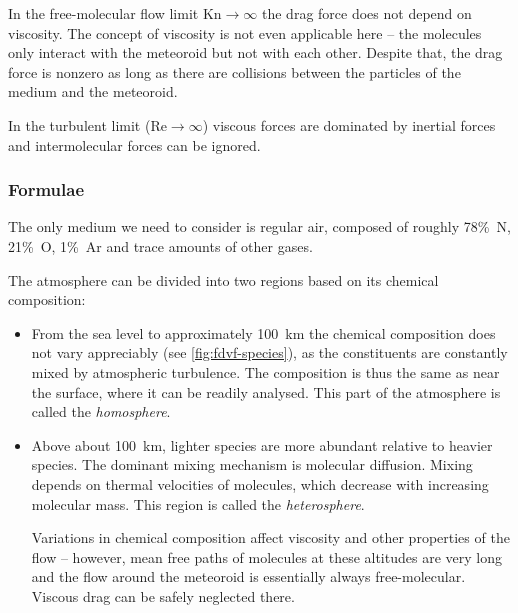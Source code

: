         In the free-molecular flow limit $\mathrm{Kn} \to \infty$ the drag force does not
        depend on viscosity. The concept of viscosity is not even applicable here -- the
        molecules only interact with the meteoroid but not with each other.
        Despite that, the drag force is nonzero as long as there are collisions
        between the particles of the medium and the meteoroid.

        In the turbulent limit ($\mathrm{Re} \to \infty$) viscous forces are dominated
        by inertial forces and intermolecular forces can be ignored.

        \subsubsection{Formulae} \label{fdvf}
            The only medium we need to consider is regular air, composed of roughly 78\%~N,
            21\%~O, 1\%~Ar and trace amounts of other gases.

            \begin{example}
                The atmosphere can be divided into two regions based on its chemical composition:
                \begin{itemize}
                    \item From the sea level to approximately \SI{100}{\kilo\metre} the chemical
                        composition does not vary appreciably (see \cref{fig:fdvf-species}),
                        as the constituents are constantly mixed by atmospheric turbulence.
                        The composition is thus the same as near the surface, where it can be readily analysed.
                        This part of the atmosphere is called the \emph{homosphere}.
                    \item Above about \SI{100}{\kilo\metre}, lighter species are more abundant
                        relative to heavier species. The dominant mixing mechanism is molecular diffusion.
                        Mixing depends on thermal velocities of molecules, which decrease
                        with increasing molecular mass. This region is called the \emph{heterosphere}.

                        Variations in chemical composition affect viscosity and other properties
                        of the flow -- however, mean free paths of molecules at these altitudes are
                        very long and the flow around the meteoroid is essentially always free-molecular.
                        Viscous drag can be safely neglected there.
                \end{itemize}
            \end{example}

